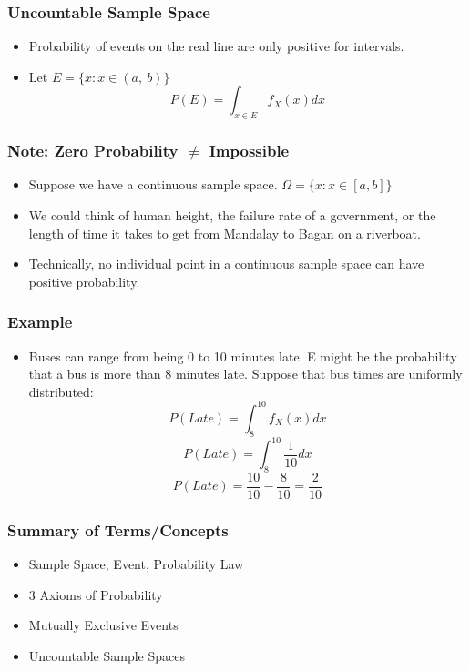 \documentclass[handout]{beamer}
\numberwithin{equation}{section}
\begin{document}
\begin{frame}
\frametitle{Uncountable Sample Space} 
\begin{itemize}
\item[] Probability of events on the real line are only positive for intervals.
\item Let $E=\{x : x \in(a,\ b)\}$
$$P(E)=\int_{x \in E} f_X(x) dx$$
 \end{itemize}
\end{frame}


\begin{frame}
\frametitle{Note: Zero Probability $\neq$ Impossible} 

\begin{itemize}
\item Suppose we have a continuous sample space.  $\Omega=\{x : x \in [a,b]\}$
\item We could think of human height, the failure rate of a government, or the length of time it takes to get from Mandalay to Bagan on a riverboat.
\item Technically, no individual point in a continuous sample space can have positive probability.  
\end{itemize}
\end{frame}



\begin{frame}
\frametitle{Example} 
\begin{itemize}
\item Buses can range from being 0 to 10 minutes late.  E might be the probability that a bus is more than 8 minutes late.  Suppose that bus times are uniformly distributed:
 $$P(Late)=\int_{8}^{10} f_X(x) dx$$
 $$P(Late)=\int_{8}^{10} \frac{1}{10}dx$$
 $$P(Late)=\frac{10}{10}-\frac{8}{10}=\frac{2}{10}$$
\end{itemize}
\end{frame}



\begin{frame}
\frametitle{Summary of Terms/Concepts}
\begin{itemize}
\item Sample Space, Event, Probability Law
\item 3 Axioms of Probability 
\item Mutually Exclusive Events
\item Uncountable Sample Spaces
\end{itemize}
\end{frame}
\end{document}
